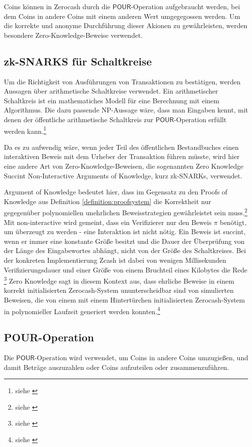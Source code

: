 Coins können in Zerocash durch die \( \textsf{POUR} \)-Operation aufgebraucht werden, bei dem Coins in andere Coins mit einem anderen Wert \glqq{}umgegegossen\grqq{} werden. Um die korrekte und anonyme Durchführung dieser Akionen zu gewährleisten, werden besondere Zero-Knowledge-Beweise verwendet.

\subsection{zk-SNARKS für \glqq{}Schaltkreise\grqq{}}

Um die Richtigkeit von Ausführungen von Transaktionen zu bestätigen, werden Aussagen über arithmetische Schaltkreise verwendet. Ein arithmetischer Schaltkreis ist ein mathematiches Modell für eine Berechnung mit einem Algorithmus. Die dazu passende NP-Aussage wäre, dass man Eingaben kennt, mit denen der öffentliche arithmetische Schaltkreis zur \( \textsf{POUR} \)-Operation erfüllt werden kann.\footnote{siehe \cite[Seite 5]{zksnark}}

Da es zu aufwendig wäre, wenn jeder Teil des öffentlichen Bestandbuches einen interaktiven Beweis mit dem Urheber der Transaktion führen müsste, wird hier eine andere Art von Zero-Knowledge-Beweisen, die sogenannten Zero Knowledge Succint Non-Interactive Arguments of Knowledge, kurz zk-SNARKs, verwendet.

Argument of Knowledge bedeutet hier, dass im Gegensatz zu den Proofs of Knowledge aus Definition \ref{definition:proofsystem}  die Korrektheit nur gegegenüber polynomiellen unehrlichen Beweisstrategien gewährleistet sein muss.\footnote{siehe \cite[Seite 5]{20yearszeroknowledge}} Mit non-interactive wird gemeint, dass ein Verifizierer nur den Beweis \( \pi \) benötigt, um überzeugt zu werden - eine Interaktion ist nicht nötig. Ein Beweis ist succint, wenn er immer eine konstante Größe besitzt und die Dauer der Überprüfung von der Länge des Eingabewortes abhängt, nicht von der Größe des Schaltkreises. Bei der konkreten Implementierung Zcash ist dabei von wenigen Millisekunden Verifizierungsdauer und einer Größe von einem Bruchteil eines Kilobytes die Rede \footnote{siehe \cite[Seite 5 + 29]{zerocash}} Zero Knowledge sagt in diesem Kontext aus, dass ehrliche Beweise in einem korrekt initialisierten Zerocash-System ununterscheidbar sind von simulierten Beweisen, die von einem mit einem Hintertürchen initialisierten Zerocash-System in polynomieller Laufzeit generiert werden konnten.\footnote{siehe \cite[Seite 11]{zerocash}}

\subsection{POUR-Operation}
Die \( \textsf{POUR} \)-Operation wird verwendet, um Coins in andere Coins umzugießen, und damit Beträge auszuzahlen oder Coins aufzuteilen oder zusammenzuführen.

